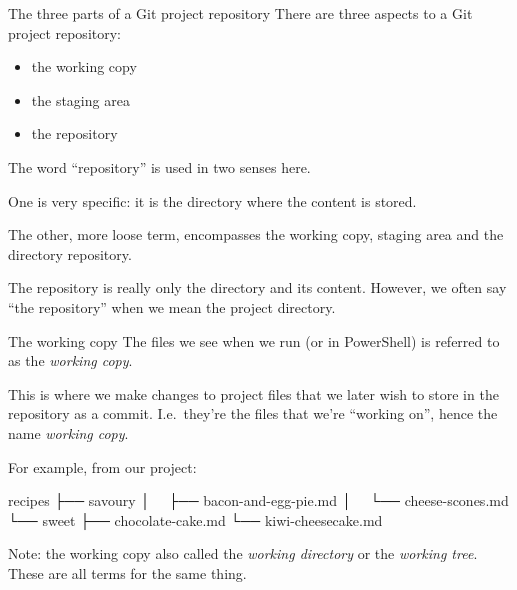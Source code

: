 \documentclass{git_course}
\begin{document}
\begin{frame}[fragile]{The three parts of a Git project repository}
    There are three aspects to a Git project repository:
    \begin{itemize}
        \item the working copy
        \item the staging area
        \item the repository
    \end{itemize}

    The word ``repository'' is used in two senses here.

    One is very specific: it is the  directory where the content
    is stored.

    The other, more loose term, encompasses the working copy, staging area
    and the  directory repository.

    The repository is really only the  directory and its content.
    However, we often say ``the repository'' when we mean the project
    directory.
\end{frame}

\begin{frame}[fragile]{The working copy}
    The files we see when we run  (or  in PowerShell) is
    referred to as the \emph{working copy}.

    This is where we make changes to project files that we later wish to
    store in the repository as a commit.  I.e.\  they're the files that
    we're ``working on'', hence the name \emph{working copy}.

    For example, from our  project:
    \begin{outputcode}
recipes
├── savoury
│   ├── bacon-and-egg-pie.md
│   └── cheese-scones.md
└── sweet
    ├── chocolate-cake.md
    └── kiwi-cheesecake.md
    \end{outputcode}

    Note: the working copy also called the \emph{working directory} or the
    \emph{working tree}.  These are all terms for the same thing.
\end{frame}
\end{document}
